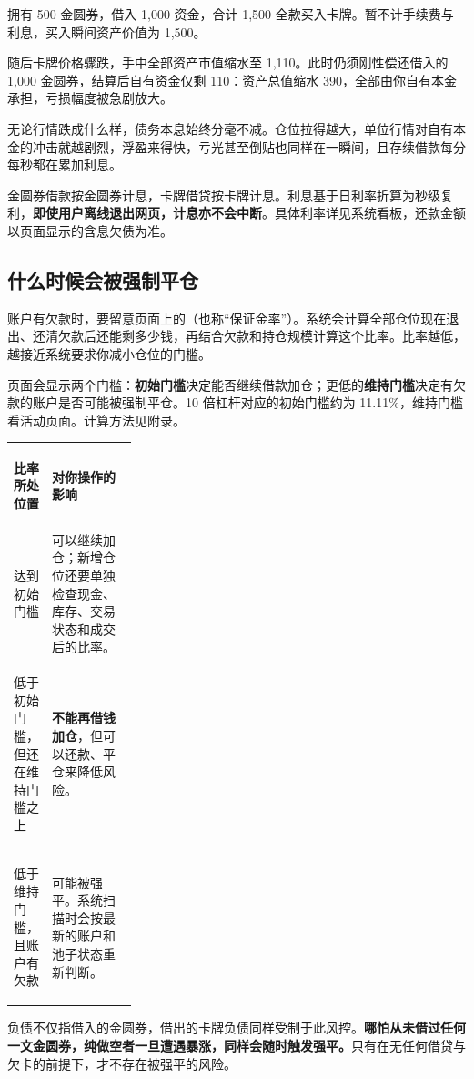 \documentclass[11pt,a4paper,twoside]{article}
\newcommand{\gold}{金圆券}
\begin{document}
\begin{exbox}[title={例：行情下跌的可能后果},breakable=false]
拥有 500 \gold{}，借入 1,000 资金，合计 1,500 全款买入卡牌。暂不计手续费与利息，买入瞬间资产价值为 1,500。

随后卡牌价格骤跌，手中全部资产市值缩水至 1,110。此时仍须刚性偿还借入的 1,000 \gold{}，结算后自有资金仅剩 110：资产总值缩水 390，全部由你自有本金承担，亏损幅度被急剧放大。
\end{exbox}

无论行情跌成什么样，债务本息始终分毫不减。仓位拉得越大，单位行情对自有本金的冲击就越剧烈，浮盈来得快，亏光甚至倒贴也同样在一瞬间，且存续借款每分每秒都在累加利息。

金圆券借款按金圆券计息，卡牌借贷按卡牌计息。利息基于日利率折算为秒级复利，\textbf{即使用户离线退出网页，计息亦不会中断}。具体利率详见系统看板，还款金额以页面显示的含息欠债为准。
\subsection{什么时候会被强制平仓}

账户有欠款时，要留意页面上的（也称“保证金率”）。系统会计算全部仓位现在退出、还清欠款后还能剩多少钱，再结合欠款和持仓规模计算这个比率。比率越低，越接近系统要求你减小仓位的门槛。

页面会显示两个门槛：\textbf{初始门槛}决定能否继续借款加仓；更低的\textbf{维持门槛}决定有欠款的账户是否可能被强制平仓。10 倍杠杆对应的初始门槛约为 11.11\%，维持门槛看活动页面。计算方法见附录。

\begin{tabularx}{\linewidth}{@{}>{\bfseries\raggedright\arraybackslash}p{0.27\linewidth} X@{}}
\toprule
\rowcolor{lightGray}
比率所处位置 & 对你操作的影响 \\
\midrule
\rowcolor{profitGreen!5!white}
达到初始门槛 & 可以继续加仓；新增仓位还要单独检查现金、库存、交易状态和成交后的比率。\\
\rowcolor{goldAccent!8!white}
低于初始门槛，但还在维持门槛之上 & \textbf{不能再借钱加仓}，但可以还款、平仓来降低风险。\\
\rowcolor{lossRed!6!white}
低于维持门槛，且账户有欠款 & 可能被强平。系统扫描时会按最新的账户和池子状态重新判断。\\
\bottomrule
\end{tabularx}


负债不仅指借入的\gold{}，借出的卡牌负债同样受制于此风控。\textbf{哪怕从未借过任何一文金圆券，纯做空者一旦遭遇暴涨，同样会随时触发强平。}只有在无任何借贷与欠卡的前提下，才不存在被强平的风险。
\end{document}
